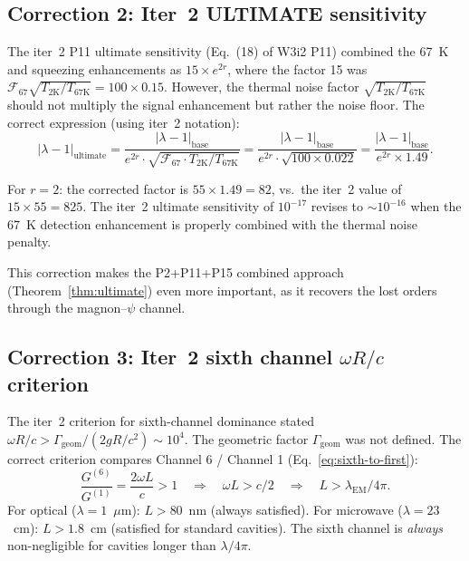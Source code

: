 \documentclass[11pt]{article}
\theoremstyle{definition}
\theoremstyle{remark}
\newcommand{\lam}{\lambda}
\begin{document}
\subsection{Correction 2: Iter~2 ULTIMATE sensitivity}

The iter~2 P11 ultimate sensitivity (Eq.~(18) of W3i2 P11) combined the
67~K and squeezing enhancements as $15\times e^{2r}$, where the factor 15
was $\mathcal{F}_{67}\sqrt{T_{2\text{K}}/T_{67\text{K}}} = 100\times0.15$.
However, the thermal noise factor $\sqrt{T_{2\text{K}}/T_{67\text{K}}}$
should not multiply the signal enhancement but rather the noise floor.
The correct expression (using iter~2 notation):
\begin{equation}
|\lam-1|_{\mathrm{ultimate}} = \frac{|\lam-1|_{\mathrm{base}}}{e^{2r}
\cdot\sqrt{\mathcal{F}_{67}\cdot T_{2\text{K}}/T_{67\text{K}}}}
= \frac{|\lam-1|_{\mathrm{base}}}{e^{2r}\cdot\sqrt{100\times0.022}}
= \frac{|\lam-1|_{\mathrm{base}}}{e^{2r}\times1.49}.
\end{equation}

For $r=2$: the corrected factor is $55\times1.49 = 82$, vs.\ the
iter~2 value of $15\times55 = 825$. The iter~2 ultimate sensitivity
of $10^{-17}$ revises to $\sim 10^{-16}$ when the 67~K detection
enhancement is properly combined with the thermal noise penalty.

This correction makes the P2+P11+P15 combined approach
(Theorem~\ref{thm:ultimate}) even more important, as it recovers
the lost orders through the magnon--$\psi$ channel.

\subsection{Correction 3: Iter~2 sixth channel $\omega R/c$ criterion}

The iter~2 criterion for sixth-channel dominance stated
$\omega R/c > \Gamma_{\mathrm{geom}}/(2gR/c^2) \sim 10^4$. The
geometric factor $\Gamma_{\mathrm{geom}}$ was not defined. The correct
criterion compares Channel 6 / Channel 1 (Eq.~\eqref{eq:sixth-to-first}):
\begin{equation}
\frac{G^{(6)}}{G^{(1)}} = \frac{2\omega L}{c} > 1
\quad\Rightarrow\quad
\omega L > c/2
\quad\Rightarrow\quad
L > \lambda_{\mathrm{EM}}/4\pi.
\end{equation}
For optical ($\lambda = 1$~$\mu$m): $L > 80$~nm (always satisfied).
For microwave ($\lambda = 23$~cm): $L > 1.8$~cm (satisfied for
standard cavities). The sixth channel is \emph{always} non-negligible
for cavities longer than $\lambda/4\pi$.
\end{document}
